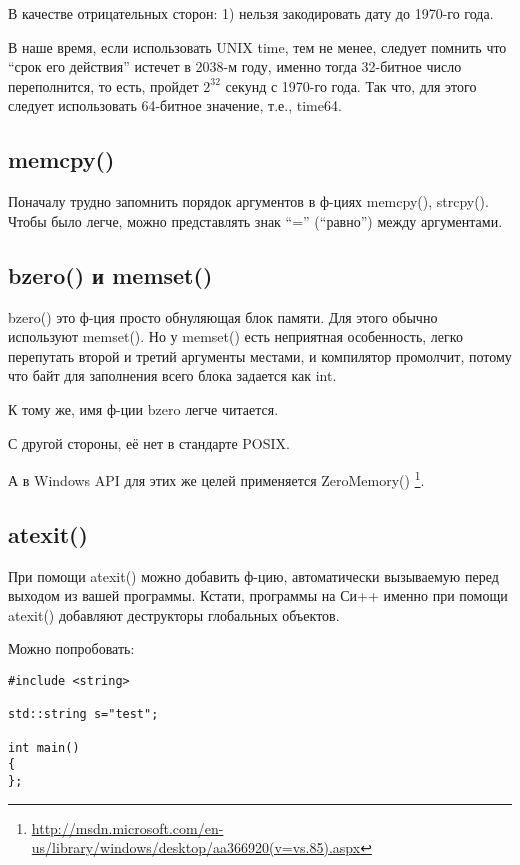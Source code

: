 В качестве отрицательных сторон: 1) нельзя закодировать дату до 1970-го года.

В наше время, если использовать UNIX time, тем не менее, следует помнить что ``срок его действия'' истечет
в 2038-м году, именно тогда 32-битное число переполнится, то есть, пройдет $2^{32}$ секунд с 1970-го года.
Так что, для этого следует использовать 64-битное значение, т.е., time64.


\label{memcpy}
\subsection{memcpy()}

Поначалу трудно запомнить порядок аргументов в ф-циях memcpy(), strcpy(). Чтобы было легче, можно представлять
знак ``='' (``равно'') между аргументами.

\label{bzero}
\subsection{bzero() и memset()}

bzero() это ф-ция просто обнуляющая блок памяти.
Для этого обычно используют memset(). Но у memset() есть неприятная особенность, легко перепутать второй
и третий аргументы местами, и компилятор промолчит, потому что байт для заполнения всего блока задается как int.

К тому же, имя ф-ции bzero легче читается.

С другой стороны, её нет в стандарте POSIX.

А в Windows API для этих же целей применяется ZeroMemory()
\footnote{\url{http://msdn.microsoft.com/en-us/library/windows/desktop/aa366920(v=vs.85).aspx}}.



\subsection{atexit()}

При помощи atexit() можно добавить ф-цию, автоматически вызываемую перед выходом из вашей программы.
Кстати, программы на Си++ именно при помощи atexit() добавляют деструкторы глобальных объектов.

Можно попробовать:

\begin{lstlisting}
#include <string>

std::string s="test";

int main()
{
};
\end{lstlisting}

